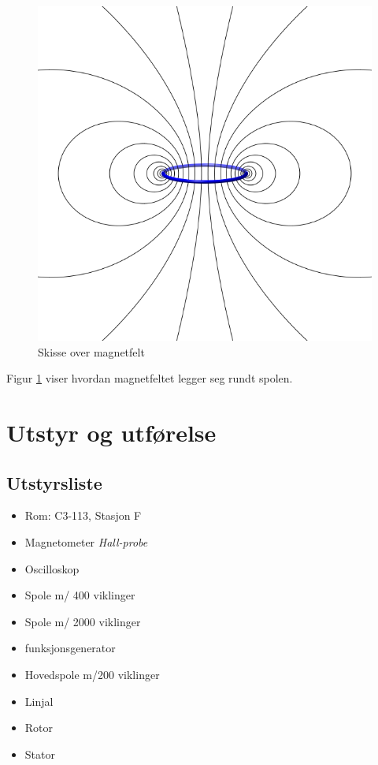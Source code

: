 \documentclass[12pt,norsk,a4paper]{article}
\begin{document}
\begin{figure}[H]
\begin{center}
\includegraphics[scale=0.4]{magnetsime-rundt-spole.png}
\caption{Skisse over magnetfelt}
\label{fig:skisse-magnetfelt}
\end{center}
\end{figure}
Figur \ref{fig:skisse-magnetfelt} viser hvordan magnetfeltet legger seg rundt spolen.






\clearpage



\section{Utstyr og utførelse}

\subsection*{Utstyrsliste}
    \begin{itemize}
    \item Rom: C3-113, Stasjon F
    \item Magnetometer \textit{Hall-probe}
    \item Oscilloskop \textit{}
    \item Spole m/ 400 viklinger
    \item Spole m/ 2000 viklinger
    \item funksjonsgenerator
    \item Hovedspole m/200 viklinger
    \item Linjal
    \item Rotor
    \item Stator
    \end{itemize}
\end{document}
